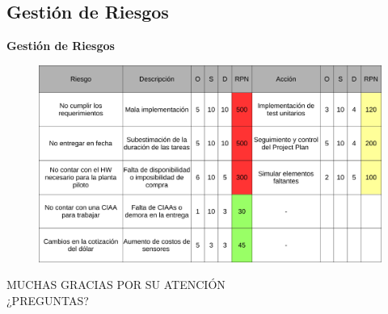 \documentclass{beamer}
\begin{document}
\subsection[Riesgos]{Gestión de Riesgos}

\begin{frame}{\textbf{Gestión de Riesgos}}
\fontsize{14pt}{15}\selectfont
	\begin{figure}[H]
	  	\includegraphics[width=1\textwidth]{./imagenes/tabla-riesgo.pdf}
	\end{figure}	  
\end{frame}


\begingroup
\makeatletter
\setlength{\hoffset}{-.5\beamer@sidebarwidth}
\makeatother
\begin{frame}
\fontsize{18pt}{15}\selectfont
\begin{center}
	MUCHAS GRACIAS POR SU ATENCIÓN\\
	\vspace{2cm}
	¿PREGUNTAS?
\end{center}
\end{frame}
\endgroup
\end{document}
